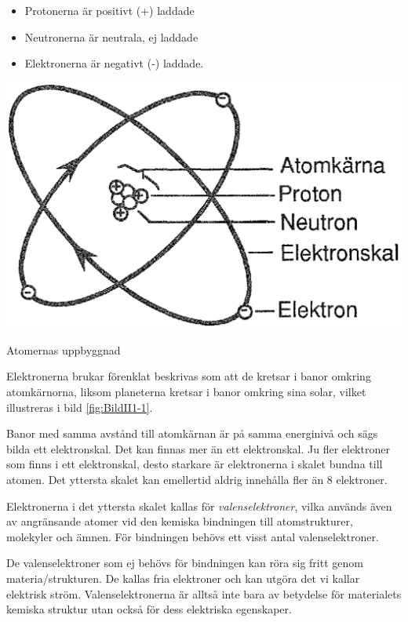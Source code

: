 \begin{itemize}
	\item Protonerna är positivt (+) laddade
	\item Neutronerna är neutrala, ej laddade
	\item Elektronerna är negativt (-) laddade.
\end{itemize}

\begin{marginfigure}%
  \includegraphics{images/cropped_pdfs/bild_2_1-01.pdf}
  \caption{Atomernas uppbyggnad}
  \label{fig:BildII1-1}
  \vspace{-20pt}
\end{marginfigure}

Elektronerna brukar förenklat beskrivas som att de kretsar i banor omkring atomkärnorna, 
liksom planeterna kretsar i banor omkring sina solar, vilket illustreras i 
bild \ref{fig:BildII1-1}.

Banor med samma avstånd till atomkärnan är på samma energinivå och sägs bilda
ett elektronskal. Det kan finnas mer än ett elektronskal. Ju fler elektroner 
som finns i ett elektronskal, desto starkare är elektronerna i skalet bundna
till atomen.
Det yttersta skalet kan emellertid aldrig innehålla fler än 8 elektroner.

Elektronerna i det yttersta skalet kallas för \emph{valenselektroner}, vilka
används även av angränsande atomer vid den kemiska bindningen till
atomstrukturer, molekyler och ämnen.
För bindningen behövs ett visst antal valenselektroner.

De valenselektroner som ej behövs för bindningen kan röra sig fritt genom
materia/strukturen.
De kallas fria elektroner och kan utgöra det vi kallar elektrisk ström.
Valenselektronerna är alltså inte bara av betydelse för materialets kemiska
struktur utan också för dess elektriska egenskaper.

